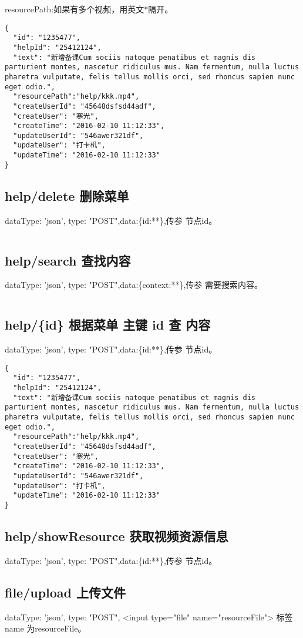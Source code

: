 \documentclass[UTF8]{ctexart}
\begin{document}
resourcePath:如果有多个视频，用英文*隔开。

\begin{lstlisting}
{
  "id": "1235477",
  "helpId": "25412124",
  "text": "新增备课Cum sociis natoque penatibus et magnis dis parturient montes, nascetur ridiculus mus. Nam fermentum, nulla luctus pharetra vulputate, felis tellus mollis orci, sed rhoncus sapien nunc eget odio.",
  "resourcePath":"help/kkk.mp4",
  "createUserId": "45648dsfsd44adf",
  "createUser": "寒光",
  "createTime": "2016-02-10 11:12:33",
  "updateUserId": "546awer321df",
  "updateUser": "打卡机",
  "updateTime": "2016-02-10 11:12:33"
}
\end{lstlisting}


\subsection{help/delete   删除菜单}
dataType: 'json', type: "POST",data:\{id:**\},传参 节点id。


\begin{lstlisting}

\end{lstlisting}

\subsection{help/search   查找内容}
dataType: 'json', type: "POST",data:\{context:**\},传参 需要搜索内容。


\begin{lstlisting}

\end{lstlisting}

\subsection{help/\{id\}     根据菜单 主键 id 查 内容}
dataType: 'json', type: "POST",data:\{id:**\},传参 节点id。


\begin{lstlisting}
{
  "id": "1235477",
  "helpId": "25412124",
  "text": "新增备课Cum sociis natoque penatibus et magnis dis parturient montes, nascetur ridiculus mus. Nam fermentum, nulla luctus pharetra vulputate, felis tellus mollis orci, sed rhoncus sapien nunc eget odio.",
  "resourcePath":"help/kkk.mp4",
  "createUserId": "45648dsfsd44adf",
  "createUser": "寒光",
  "createTime": "2016-02-10 11:12:33",
  "updateUserId": "546awer321df",
  "updateUser": "打卡机",
  "updateTime": "2016-02-10 11:12:33"
}
\end{lstlisting}

\subsection{help/showResource 获取视频资源信息}
dataType: 'json', type: "POST",data:\{id:**\},传参 节点id。

\subsection{file/upload   上传文件}
dataType: 'json', type: "POST", <input type="file" name="resourceFile"> 标签 name 为resourceFile。
\end{document}

